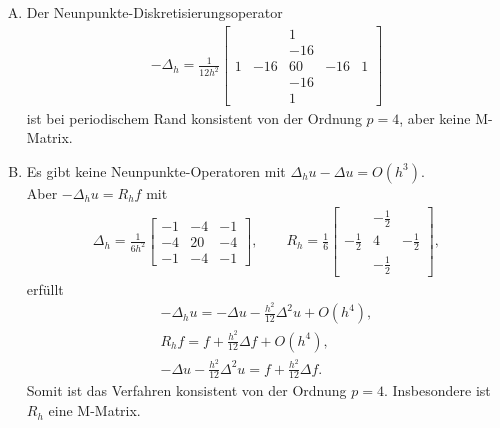 \begin{Diskretisierungen hoher Ordnung}
    \begin{enumerate}[A)]
	\item
	    Der Neunpunkte-Diskretisierungsoperator
	    \begin{eqnarray*}
            -\Delta_h = \frac{1}{12 h^2}
                        \begin{bmatrix}
                            & & 1 & & \\
                            & & -16 & & \\
                            1 & -16 & 60 & -16 & 1 \\
                            & & -16 & & \\
                            & & 1 & &
                        \end{bmatrix}
	    \end{eqnarray*}
	    ist bei periodischem Rand konsistent von der Ordnung $p = 4$, aber keine
        M-Matrix.
	\item
	    Es gibt keine Neunpunkte-Operatoren mit
	    $\Delta_h u - \Delta u = O(h^3)$. \\
	    Aber $-\Delta_h u = R_h f$ mit
	    \begin{eqnarray*}
            \Delta_h =  \frac{1}{6 h^2}
                        \begin{bmatrix}
                            -1 & -4 & -1 \\
                            -4 & 20 & -4 \\
                            -1 & -4 & -1
                        \end{bmatrix},
            \qquad
            R_h = \frac{1}{6}
                  \begin{bmatrix}
                      & -\frac{1}{2} & \\
                      -\frac{1}{2} & 4 & -\frac{1}{2} \\
                      & -\frac{1}{2} &
                  \end{bmatrix},
	    \end{eqnarray*}
	    erfüllt
	    \begin{eqnarray*}
              -\Delta_h u
            = -\Delta u - \frac{h^2}{12} \Delta^2 u + O(h^4), \\
              R_h f
            = f + \frac{h^2}{12} \Delta f + O(h^4), \\
              -\Delta u - \frac{h^2}{12} \Delta^2 u = f + \frac{h^2}{12}
              \Delta f.
	    \end{eqnarray*}
	    Somit ist das Verfahren konsistent von der Ordnung $p = 4$. Insbesondere
        ist $R_h$ eine M-Matrix.
    \end{enumerate}
\end{Diskretisierungen hoher Ordnung}


